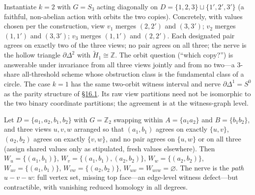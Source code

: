 \begin{thmrem}

Instantiate \(k = 2\) with \(G = S_3\) acting diagonally on \(D = \{1,2,3\} \sqcup \{1',2',3'\}\) (a faithful, non-abelian action with orbits the two copies). Concretely, with values chosen per the construction, view \(v_1\) merges \((2,2')\) and \((3,3')\); \(v_2\) merges \((1,1')\) and \((3,3')\); \(v_3\) merges \((1,1')\) and \((2,2')\). Each designated pair agrees on exactly two of the three views; no pair agrees on all three; the nerve is the hollow triangle \(\partial\Delta^2\) with \(\widetilde{H}_1 \cong \mathbb{Z}\). The orbit question (``which copy?'') is answerable under invariance from all three views jointly and from no two---\hspace{0pt}a \(3\)-share all-threshold scheme whose obstruction class is the fundamental class of a circle. The case \(k=1\) has the same two-orbit witness interval and nerve \(\partial\Delta^1=S^0\) as the parity structure of \hyperlink{sec:16.1}{§16.1}. Its raw view partitions need not be isomorphic to the two binary coordinate partitions; the agreement is at the witness-graph level.
\end{thmrem}


\begin{thmrem}

Let \(D = \{a_1, a_2, b_1, b_2\}\) with \(G = \mathbb{Z}_2\) swapping within \(A = \{a_1 a_2\}\) and \(B = \{b_1 b_2\}\), and three views \(u, v, w\) arranged so that \((a_1, b_1)\) agrees on exactly \(\{u, v\}\), \((a_2, b_2)\) agrees on exactly \(\{v, w\}\), and no pair agrees on \(\{u, w\}\) or on all three (assign shared values only as stipulated, fresh values elsewhere). Then \(W_u = \{(a_1,b_1)\}\), \(W_v = \{(a_1,b_1), (a_2,b_2)\}\), \(W_w = \{(a_2,b_2)\}\), \(W_{uv} = \{(a_1,b_1)\}\), \(W_{vw} = \{(a_2,b_2)\}\), \(W_{uw} = W_{uvw} = \varnothing\). The nerve is the \emph{path} \(u - v - w\): full vertex set, missing top face---\hspace{0pt}an edge-level witness defect---\hspace{0pt}but contractible, with vanishing reduced homology in all degrees.
\end{thmrem}

